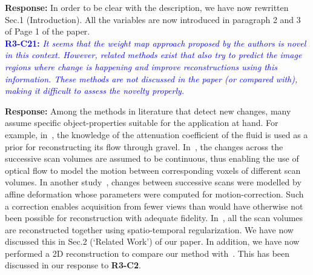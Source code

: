 \documentclass{article}
\begin{document}
\textbf{Response:} In order to be clear with the description, we have now rewritten Sec.1 (Introduction). All the variables are now introduced in paragraph 2 and 3 of Page 1 of the paper.\\

\textcolor{blue}{\textbf{R3-C21:}\textit{ It seems that the weight map approach proposed by the authors is novel in this context. However, related methods exist that also try to predict the image regions where change is happening and improve reconstructions using this information. These methods are not discussed in the paper (or compared with), making it difficult to assess the novelty properly.}}

\textbf{Response:} Among the methods in literature that detect new changes, many assume specific object-properties suitable for the application at hand.  For example, in~\cite{Van2015}, the knowledge of the attenuation coefficient of the fluid is used as a prior for reconstructing its flow through gravel. In~\cite{koen2020}, the changes across the successive scan volumes are assumed to be continuous, thus enabling the use of optical flow to model the motion between corresponding voxels of different scan volumes. In another study~\cite{vincent2017}, changes between successive scans were modelled by affine deformation whose parameters were computed for motion-correction. Such a correction enables acquisition from fewer views than would have otherwise not been possible for reconstruction with adequate fidelity. In~\cite{daniil2015}, all the scan volumes are reconstructed together using spatio-temporal regularization. We have now discussed this in Sec.2 (`Related Work') of our paper.
In addition, we have now performed a 2D reconstruction to compare our method with~\cite{Lee2012}. This has been discussed in our response to \textbf{R3-C2}.\\


\end{document}

